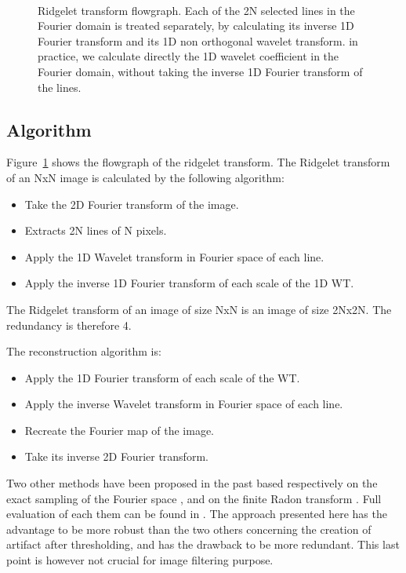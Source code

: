 \documentclass[11pt,a4paper]{article}
\begin{document}
\begin{figure}[htb]
\centerline{
\hbox{
}}
\caption{Ridgelet transform flowgraph. Each of the 2N selected lines 
in the Fourier domain is treated separately, by calculating its
inverse 1D Fourier transform and its 1D non orthogonal wavelet transform.
in practice, we calculate directly the 1D wavelet coefficient 
in the Fourier domain, without taking the inverse 1D Fourier transform
of the lines.}
\label{fig_ridgelet}
\end{figure}

\subsection{Algorithm}
Figure~\ref{fig_ridgelet} shows the flowgraph of the ridgelet transform.
The Ridgelet transform of an NxN image   
is calculated by the following algorithm:
\begin{itemize}
\item Take the 2D Fourier transform of the image.
\item Extracts 2N lines of N pixels.
\item Apply the 1D Wavelet transform in Fourier space of each line.
\item Apply the inverse 1D Fourier transform of each scale of the 1D WT.
\end{itemize}
The Ridgelet transform of an image of size NxN is an image of size 2Nx2N.
The redundancy is therefore 4.

The reconstruction algorithm is:
\begin{itemize}
\item Apply the 1D Fourier transform of each scale of the WT.
\item Apply the inverse Wavelet transform in Fourier space of each line.
\item Recreate the Fourier map of the image. 
\item Take its inverse 2D Fourier transform.
\end{itemize}

Two other methods have been proposed in the 
past \cite{cur:candes98,cur:do00} based respectively on the exact sampling
of the Fourier space \cite{cur:candes98}, 
and on the finite Radon transform \cite{cur:matus93}. Full evaluation of each 
them can be found in \cite{cur:donoho00}.
The approach presented here has the advantage to be more robust than the
two others concerning the creation of artifact after thresholding, and 
has the drawback to be more redundant. This last point is however not
crucial for image filtering purpose.
\end{document}
